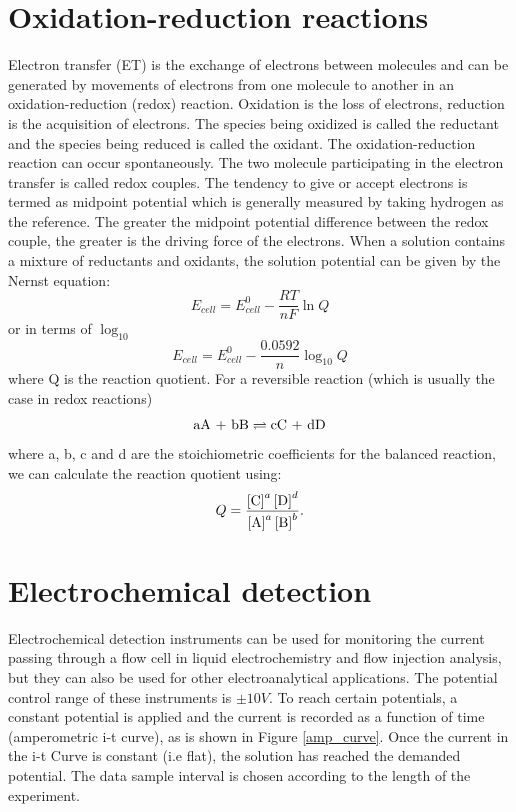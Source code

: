 \documentclass[twoside,single]{lion-msc}
\begin{document}
\section{Oxidation-reduction reactions}
Electron transfer (ET) is the exchange of electrons between molecules and can be generated by movements of electrons from one molecule to another in an oxidation-reduction (redox) reaction. Oxidation is the loss of electrons, reduction is the acquisition of electrons. The species being oxidized is called the reductant and the species being reduced is called the oxidant. The oxidation-reduction reaction can occur spontaneously. The two molecule participating in the electron transfer is called redox couples. The tendency to give or accept electrons is termed as midpoint potential which is generally measured by taking hydrogen as the reference. The greater the midpoint potential difference between the redox couple, the greater is the driving force of the electrons. When a solution contains a mixture of reductants and oxidants, the solution potential can be given by the Nernst equation:
\begin{equation} \label{nernst}
E_{cell} = E^{0}_{cell} - \frac{RT}{nF} \ln Q
\end{equation}
or in terms of $\log_{10}$
\begin{equation}
E_{cell} = E^{0}_{cell} - \frac{0.0592}{n} \log_{10} Q
\end{equation}
where Q is the reaction quotient. For a reversible reaction (which is usually the case in redox reactions)
\begin{equation}
 \textup{aA + bB}\rightleftharpoons\textup{cC + dD}
\end{equation}
where a, b, c and d are the stoichiometric coefficients for the balanced reaction, we can calculate the reaction quotient using:
\begin{equation}
Q=\frac{\left [\textup{C}  \right ]^{a}\left [\textup{D}  \right ]^{d}}{\left [\textup{A}  \right ]^{a}\left [\textup{B}  \right ]^{b}}.
\end{equation}

\section{Electrochemical detection}
Electrochemical detection instruments can be used for monitoring the current passing through a flow cell in liquid electrochemistry and flow injection analysis, but they can also be used for other electroanalytical applications. The potential control range of these instruments is $\pm10V$. To reach certain potentials, a constant potential is applied and the current is recorded as a function of time (amperometric i-t curve), as is shown in Figure \ref{amp_curve}. Once the current in the i-t Curve is constant (i.e flat), the solution has reached the demanded potential. The data sample interval is chosen according to the length of the experiment.
\end{document}
